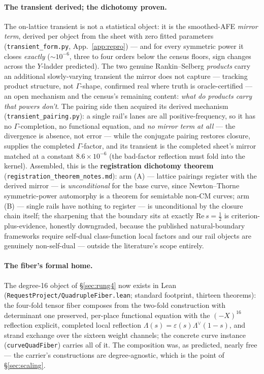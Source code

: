 \documentclass[11pt]{article}
\theoremstyle{definition}
\theoremstyle{remark}
\begin{document}
\paragraph{The transient derived; the dichotomy proven.} The on-lattice
transient is not a statistical object: it is the smoothed-AFE
\emph{mirror term}, derived per object from the sheet with zero fitted
parameters (\texttt{transient\_form.py}, App.~\ref{app:repro}) --- and for
every symmetric power it closes \emph{exactly} ($\sim\!10^{-6}$, three to
four orders below the census floors, sign changes across the $Y$-ladder
predicted). The two genuine Rankin--Selberg \emph{products} carry an
additional slowly-varying transient the mirror does not capture ---
tracking product structure, not $\Gamma$-shape, confirmed real where truth
is oracle-certified --- an open mechanism and the census's remaining
content: \emph{what do products carry that powers don't}. The pairing side
then acquired its derived mechanism (\texttt{transient\_pairing.py}): a
single rail's lanes are all positive-frequency, so it has no
$\Gamma$-completion, no functional equation, and \emph{no mirror term at
all} --- the divergence is absence, not error --- while the conjugate
pairing restores closure, supplies the completed $\Gamma$-factor, and its
transient is the completed sheet's mirror matched at a constant
$8.6\times10^{-6}$ (the bad-factor reflection must fold into the kernel).
Assembled, this is the \textbf{registration dichotomy theorem}
(\texttt{registration\_theorem\_notes.md}): arm (A) --- lattice pairings
register with the derived mirror --- is \emph{unconditional} for the base
curve, since Newton--Thorne symmetric-power automorphy \cite{NewtonThorne}
is a theorem for semistable non-CM curves; arm (B) --- single rails have
nothing to register --- is unconditional by the closure chain itself; the
sharpening that the boundary sits at exactly $\mathrm{Re}\,s=\tfrac12$ is
criterion-plus-evidence, honestly downgraded, because the published
natural-boundary frameworks \cite{Kurokawa,KoyamaKurokawa} require
self-dual class-function local factors and our rail objects are genuinely
non-self-dual --- outside the literature's scope entirely.

\paragraph{The fiber's formal home.} The degree-16 object of
\S\ref{sec:rung4} now exists in Lean
(\texttt{RequestProject/QuadrupleFiber.lean}; standard footprint, thirteen
theorems): the four-fold tensor fiber composes from the two-fold construction
with determinant one preserved, per-place functional equation with the
$(-X)^{16}$ reflection explicit, completed local reflection
$\Lambda(s)=\varepsilon(s)\Lambda^{\vee}(1-s)$, and strand exchange over the
sixteen weight channels; the concrete curve instance
(\texttt{curveQuadFiber}) carries all of it. The composition was, as
predicted, nearly free --- the carrier's constructions are degree-agnostic,
which is the point of \S\ref{sec:scaling}.
\end{document}
